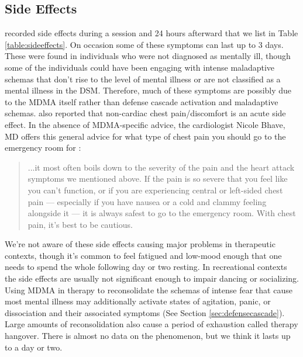 \documentclass[12pt,letterpaper]{book}
\begin{document}
\subsection*{Side Effects}
\textcite{liechtiGender} recorded side effects during a session and 24 hours afterward that we list in Table \ref{table:sideeffects}. On occasion some of these symptoms can last up to 3 days. These were found in individuals who were not diagnosed as mentally ill, though some of the individuals could have been engaging with intense maladaptive schemas that don't rise to the level of mental illness or are not classified as a mental illness in the DSM. Therefore, much of these symptoms are possibly due to the MDMA itself rather than defense cascade activation and maladaptive schemas. \textcite{colcott2024side} also reported that non-cardiac chest pain/discomfort is an acute side effect. In the absence of MDMA-specific advice, the cardiologist Nicole Bhave, MD offers this general advice for what type of chest pain you should go to the emergency room for \cite{chestPain}:
\begin{quotation}
    ...it most often boils down to the severity of the pain and the heart attack symptoms we mentioned above. If the pain is so severe that you feel like you can’t function, or if you are experiencing central or left-sided chest pain — especially if you have nausea or a cold and clammy feeling alongside it — it is always safest to go to the emergency room. With chest pain, it’s best to be cautious.
\end{quotation}
We're not aware of these side effects causing major problems in therapeutic contexts, though it's common to feel fatigued and low-mood enough that one needs to spend the whole following day or two resting. In recreational contexts the side effects are usually not significant enough to impair dancing or socializing. Using MDMA in therapy to reconsolidate the schemas of intense fear that cause most mental illness may additionally activate states of agitation, panic, or dissociation and their associated symptoms (See Section \ref{sec:defensecascade}). Large amounts of reconsolidation also cause a period of exhaustion called therapy hangover. There is almost no data on the phenomenon, but we think it lasts up to a day or two.
\FloatBarrier
\end{document}
